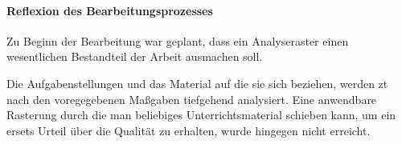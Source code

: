 \paragraph{Reflexion des Bearbeitungsprozesses}

Zu Beginn der Bearbeitung war geplant, dass ein Analyseraster einen wesentlichen Bestandteil der Arbeit ausmachen soll. 


Die Aufgabenstellungen und das Material auf die sie sich beziehen, werden \gls{zt} nach den voregegebenen Maßgaben tiefgehend analysiert. Eine anwendbare Rasterung durch die man beliebiges Unterrichtsmaterial schieben kann, um ein ersets Urteil über die Qualität zu erhalten, wurde hingegen nicht erreicht. 











